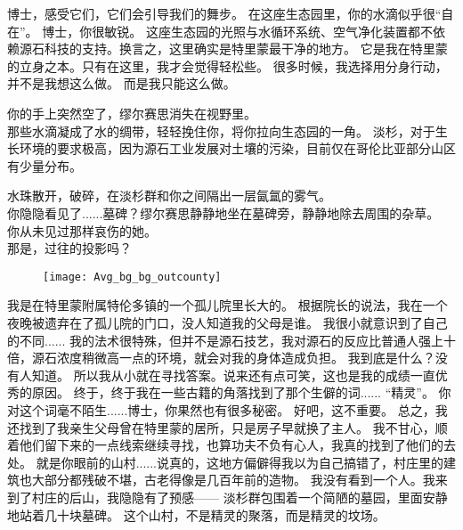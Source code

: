 \documentclass[openany]{book}
\begin{document}
\begin{dialogue}
     博士，感受它们，它们会引导我们的舞步。
     在这座生态园里，你的水滴似乎很“自在”。
     博士，你很敏锐。
     这座生态园的光照与水循环系统、空气净化装置都不依赖源石科技的支持。换言之，这里确实是特里蒙最干净的地方。
     它是我在特里蒙的立身之本。只有在这里，我才会觉得轻松些。
     很多时候，我选择用分身行动，并不是我想这么做。
     而是我只能这么做。\par
    你的手上突然空了，缪尔赛思消失在视野里。\\
    那些水滴凝成了水的绸带，轻轻挽住你，将你拉向生态园的一角。
     淡杉，对于生长环境的要求极高，因为源石工业发展对土壤的污染，目前仅在哥伦比亚部分山区有少量分布。\par
    水珠散开，破碎，在淡杉群和你之间隔出一层氤氲的雾气。\\
    你隐隐看见了......墓碑？缪尔赛思静静地坐在墓碑旁，静静地除去周围的杂草。\\
    你从未见过那样哀伤的她。\\
    那是，过往的投影吗？
    \begin{figure}[h]
        \centering
        \texttt{[image: Avg\_bg\_bg\_outcounty]}
    \end{figure}
     我是在特里蒙附属特伦多镇的一个孤儿院里长大的。
     根据院长的说法，我在一个夜晚被遗弃在了孤儿院的门口，没人知道我的父母是谁。
     我很小就意识到了自己的不同......
     我的法术很特殊，但并不是源石技艺，我对源石的反应比普通人强上十倍，源石浓度稍微高一点的环境，就会对我的身体造成负担。
     我到底是什么？没有人知道。
     所以我从小就在寻找答案。说来还有点可笑，这也是我的成绩一直优秀的原因。
     终于，终于我在一些古籍的角落找到了那个生僻的词......
     “精灵”。
     你对这个词毫不陌生......博士，你果然也有很多秘密。
     好吧，这不重要。
     总之，我还找到了我亲生父母曾在特里蒙的居所，只是房子早就换了主人。
     我不甘心，顺着他们留下来的一点线索继续寻找，也算功夫不负有心人，我真的找到了他们的去处。
     就是你眼前的山村......说真的，这地方偏僻得我以为自己搞错了，村庄里的建筑也大部分都残破不堪，古老得像是几百年前的造物。
     我没有看到一个人。我来到了村庄的后山，我隐隐有了预感——
     淡杉群包围着一个简陋的墓园，里面安静地站着几十块墓碑。
     这个山村，不是精灵的聚落，而是精灵的坟场。\par

\end{dialogue}
\end{document}
